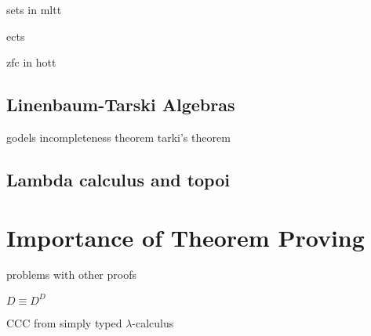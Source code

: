 sets in mltt

ects

zfc in hott

\subsection{Linenbaum-Tarski Algebras}
godels incompleteness theorem
tarki's theorem
\subsection{Lambda calculus and topoi}
\section{Importance of Theorem Proving}
problems with other proofs

$D \equiv D^D$



CCC from simply typed $\lambda$-calculus
